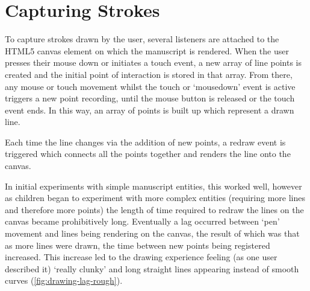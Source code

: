 \section{Capturing Strokes}
\label{sec:capturing-strokes}
To capture strokes drawn by the user, several listeners are attached to the HTML5 canvas element on which the manuscript is rendered. When the user presses their mouse down or initiates a touch event, a new array of line points is created and the initial point of interaction is stored in that array. From there, any mouse or touch movement whilst the touch or `mousedown' event is active triggers a new point recording, until the mouse button is released or the touch event ends. In this way, an array of points is built up which represent a drawn line.

Each time the line changes via the addition of new points, a redraw event is triggered which connects all the points together and renders the line onto the canvas.

In initial experiments with simple manuscript entities, this worked well, however as children began to experiment with more complex entities (requiring more lines and therefore more points) the length of time required to redraw the lines on the canvas became prohibitively long. Eventually a lag occurred between `pen' movement and lines being rendering on the canvas, the result of which was that as more lines were drawn, the time between new points being registered increased. This increase led to the drawing experience feeling (as one user described it) `really clunky' and long straight lines appearing instead of smooth curves (\cref{fig:drawing-lag-rough}).


